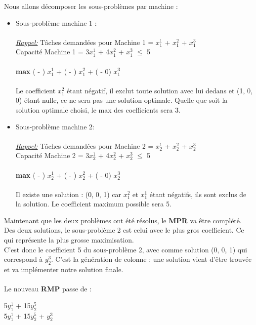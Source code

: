Nous allons décomposer les sous-problèmes par machine :
\begin{itemize}
\item{
Sous-problème machine 1 : \\ \\ 
\textit{\underline{Rappel:}}  Tâches demandées pour Machine 1 =  $x_1^1$ + $x_1^2$ + $x_1^3$  \\ 
Capacité Machine 1 = 3$x_1^1$ + 4$x_1^2$ + $x_1^3$ $\leq$ 5
\\ \\ 
\textbf{max} (  -  ) $x_1^1$ + ( -  ) $x_1^2$ + ( - 0) $x_1^3$\\
\\
 Le coefficient $x_1^2$ étant négatif, il exclut toute solution avec lui dedans et (1, 0, 0) étant nulle, ce ne sera pas une solution optimale. Quelle que soit la solution optimale choisi, le max des coefficients sera 3.
}

\item{
Sous-problème machine 2: 
\\
\\
\textit{\underline{Rappel:}}  Tâches demandées pour Machine 2 =  $x_2^1$ + $x_2^2$ + $x_2^3$  \\ 
Capacité Machine 2 = 3$x_2^1$ + 4$x_2^2$ + $x_2^3$ $\leq$ 5
\\ \\ 
\textbf{max} (  -  ) $x_2^1$ + ( -  ) $x_2^2$ + ( - 0) $x_2^3$
\\
\\ Il existe une solution : (0, 0, 1) car $x_1^2$  et $x_1^1$  étant négatifs, ils sont exclus de la solution. Le coefficient maximum possible sera 5.
}
\end{itemize}

Maintenant que les deux problèmes ont été résolus, le \textbf{MPR} va être complété. Des deux solutions, le sous-problème 2 est celui avec le plus gros coefficient. Ce qui représente la plus grosse maximisation.
\\
C'est donc le coefficient 5 du sous-problème 2, avec comme solution (0, 0, 1) qui correspond à $y_2^3$. C'est la génération de colonne : une solution vient d'être trouvée et va implémenter notre solution finale.
\\ \\ 
Le nouveau \textbf{RMP} passe de :
\begin{center}
 5$y_1^1$  + 15$y_2^5$  \\
 5$y_1^1$  + 15$y_2^5$ +   $y_2^3$
\end{center}

